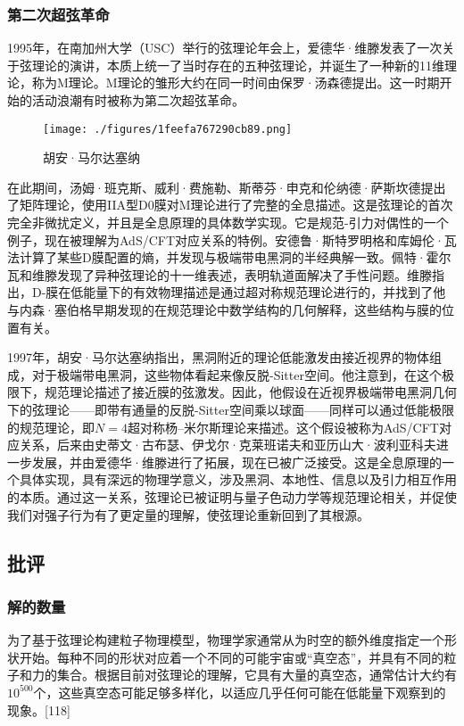 \subsubsection{第二次超弦革命}  
1995年，在南加州大学（USC）举行的弦理论年会上，爱德华·维滕发表了一次关于弦理论的演讲，本质上统一了当时存在的五种弦理论，并诞生了一种新的11维理论，称为M理论。M理论的雏形大约在同一时间由保罗·汤森德提出。这一时期开始的活动浪潮有时被称为第二次超弦革命。
\begin{figure}[ht]
\centering
\texttt{[image: ./figures/1feefa767290cb89.png]}
\caption{胡安·马尔达塞纳} \label{fig_String_17}
\end{figure}
在此期间，汤姆·班克斯、威利·费施勒、斯蒂芬·申克和伦纳德·萨斯坎德提出了矩阵理论，使用IIA型D0膜对M理论进行了完整的全息描述。这是弦理论的首次完全非微扰定义，并且是全息原理的具体数学实现。它是规范-引力对偶性的一个例子，现在被理解为AdS/CFT对应关系的特例。安德鲁·斯特罗明格和库姆伦·瓦法计算了某些D膜配置的熵，并发现与极端带电黑洞的半经典解一致。佩特·霍尔瓦和维滕发现了异种弦理论的十一维表述，表明轨道面解决了手性问题。维滕指出，D-膜在低能量下的有效物理描述是通过超对称规范理论进行的，并找到了他与内森·塞伯格早期发现的在规范理论中数学结构的几何解释，这些结构与膜的位置有关。

1997年，胡安·马尔达塞纳指出，黑洞附近的理论低能激发由接近视界的物体组成，对于极端带电黑洞，这些物体看起来像反脱-Sitter空间。他注意到，在这个极限下，规范理论描述了接近膜的弦激发。因此，他假设在近视界极端带电黑洞几何下的弦理论——即带有通量的反脱-Sitter空间乘以球面——同样可以通过低能极限的规范理论，即\(N=4\)超对称杨–米尔斯理论来描述。这个假设被称为AdS/CFT对应关系，后来由史蒂文·古布瑟、伊戈尔·克莱班诺夫和亚历山大·波利亚科夫进一步发展，并由爱德华·维滕进行了拓展，现在已被广泛接受。这是全息原理的一个具体实现，具有深远的物理学意义，涉及黑洞、本地性、信息以及引力相互作用的本质。通过这一关系，弦理论已被证明与量子色动力学等规范理论相关，并促使我们对强子行为有了更定量的理解，使弦理论重新回到了其根源。
\subsection{批评}  
\subsubsection{解的数量}  
为了基于弦理论构建粒子物理模型，物理学家通常从为时空的额外维度指定一个形状开始。每种不同的形状对应着一个不同的可能宇宙或“真空态”，并具有不同的粒子和力的集合。根据目前对弦理论的理解，它具有大量的真空态，通常估计大约有\(10^{500}\)个，这些真空态可能足够多样化，以适应几乎任何可能在低能量下观察到的现象。[118]

